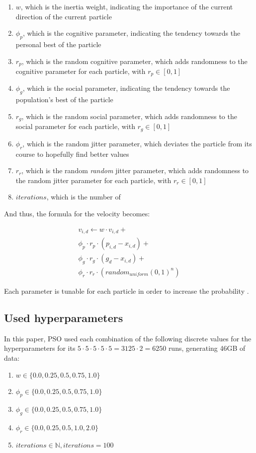 \documentclass[conference]{IEEEtran}
\begin{document}
\begin{enumerate}
    \item $w$, which is the inertia weight, indicating the importance of the current direction of the current particle 
    \item $\phi_p$, which is the cognitive parameter, indicating the tendency towards the personal best of the particle
    \item $r_p$, which is the random cognitive parameter, which adds randomness to the cognitive parameter for each particle, with $r_p \in [0, 1]$
    \item $\phi_g$, which is the social parameter, indicating the tendency towards the population's best of the particle
    \item $r_g$, which is the random social parameter, which adds randomness to the social parameter for each particle, with $r_g \in [0, 1]$ 
    \item $\phi_r$, which is the random jitter parameter, which deviates the particle from its course to hopefully find better values
    \item $r_r$, which is the random \textit{random} jitter parameter, which adds randomness to the random jitter parameter for each particle, with $r_r \in [0, 1]$
    \item $iterations$, which is the number of 
\end{enumerate}

And thus, the formula for the velocity becomes:

\begin{multline}
    v_{i,d} \leftarrow w \cdot v_{i,d}  + \\ \phi_p \cdot r_p \cdot (p_{i,d} - x_{i,d})  + \\ \phi_g \cdot r_g \cdot (g_d - x_{i,d}) + \\ \phi_r \cdot r_r \cdot (random_{uniform}(0, 1)^n)
\end{multline}

Each parameter is tunable for each particle in order to increase the probability .

\subsection{Used hyperparameters}
In this paper, PSO used each combination of the following discrete values for the hyperparameters for its $5 \cdot 5 \cdot 5 \cdot 5 \cdot 5 = 3125 \cdot 2 = 6250$
runs, generating 46GB of data:

\begin{enumerate}
    \item $w \in \{0.0, 0.25, 0.5, 0.75, 1.0\}$
    \item $\phi_p \in \{0.0, 0.25, 0.5, 0.75, 1.0\}$
    \item $\phi_g \in \{0.0, 0.25, 0.5, 0.75, 1.0\}$
    \item $\phi_r \in \{0.0, 0.25, 0.5, 1.0, 2.0\}$
    \item $iterations \in \mathbb{N}, iterations = 100$
\end{enumerate}
\end{document}
